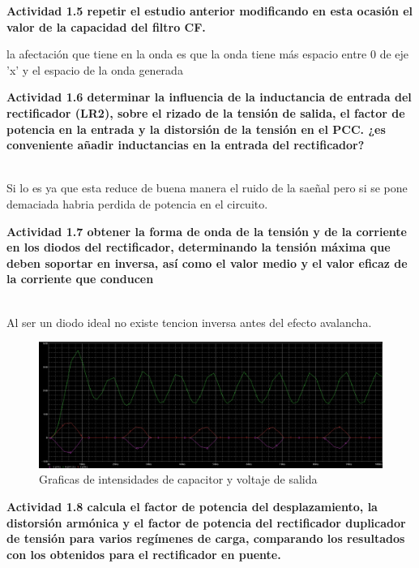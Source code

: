 \documentclass[letterpaper]{article}
\begin{document}
 \begin{large}

\textbf{Actividad 1.5 repetir el estudio anterior modificando en esta ocasión
el valor de la capacidad del filtro CF.} \end{large}
la afectación que tiene en la onda es que la onda tiene más espacio entre 0 de eje 'x' y el espacio de la onda generada 
 \begin{large}

\textbf{Actividad 1.6 determinar la influencia de la inductancia de entrada
del rectificador (LR2), sobre el rizado de la tensión de salida, el
factor de potencia en la entrada y la distorsión de la tensión en
el PCC. ¿es conveniente añadir inductancias en la entrada del rectificador? }\end{large}
 \begin{large}\\
 Si lo es ya que esta reduce de buena manera el ruido de la saeñal pero si se pone demaciada habria perdida de potencia en el circuito.

\textbf{Actividad 1.7 obtener la forma de onda de la tensión y de la corriente
en los diodos del rectificador, determinando la tensión máxima que
deben soportar en inversa, así como el valor medio y el valor eficaz
de la corriente que conducen} \end{large}\\
Al ser un diodo ideal no existe tencion inversa antes del efecto avalancha.
\begin{figure}[htb]
    \centering
    \includegraphics[scale=0.3]{ondadio.png}
    \caption{Graficas de intensidades de capacitor y voltaje de salida}
    \label{fig:cb15}
\end{figure}
 \begin{large}

\textbf{Actividad 1.8 calcula el factor de potencia del desplazamiento, la
distorsión armónica y el factor de potencia del rectificador duplicador
de tensión para varios regímenes de carga, comparando los resultados
con los obtenidos para el rectificador en puente.}\end{large}
\end{document}
